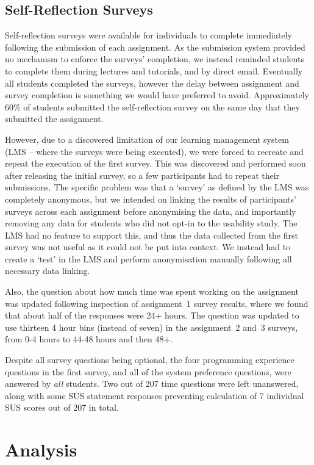 \subsection{Self-Reflection Surveys}
\label{EXEC_SURVEYS}

  Self-reflection surveys were available for individuals to complete immediately following the submission of each assignment. As the submission system provided no mechanism to enforce the surveys' completion, we instead reminded students to complete them during lectures and tutorials, and by direct email. Eventually all students completed the surveys, however the delay between assignment and survey completion is something we would have preferred to avoid. Approximately 60\% of students submitted the self-reflection survey on the same day that they submitted the assignment.

  However, due to a discovered limitation of our learning management system (LMS -- where the surveys were being executed), we were forced to recreate and repeat the execution of the first survey. This was discovered and performed soon after releasing the initial survey, so a few participants had to repeat their submissions. The specific problem was that a `survey' as defined by the LMS was completely anonymous, but we intended on linking the results of participants' surveys across each assignment before anonymising the data, and importantly removing any data for students who did not opt-in to the usability study. The LMS had no feature to support this, and thus the data collected from the first survey was not useful as it could not be put into context. We instead had to create a `test' in the LMS and perform anonymisation manually following all necessary data linking.

  Also, the question about how much time was spent working on the assignment was updated following inspection of assignment~1 survey results, where we found that about half of the responses were 24+ hours. The question was updated to use thirteen 4 hour bins (instead of seven) in the assignment~2 and~3 surveys, from 0-4 hours to 44-48 hours and then 48+.

  Despite all survey questions being optional, the four programming experience questions in the first survey, and all of the system preference questions, were answered by \emph{all} students. Two out of 207 time questions were left unanswered, along with some SUS statement responses preventing calculation of 7 individual SUS scores out of 207 in total.


\section{Analysis}
\label{ANALYSIS}


